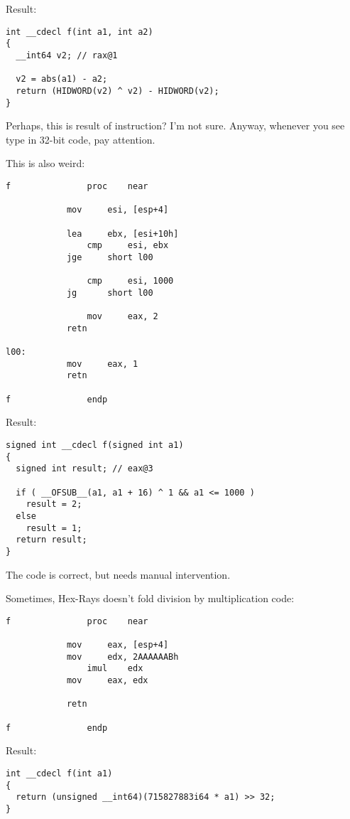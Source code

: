 Result:

\begin{lstlisting}
int __cdecl f(int a1, int a2)
{
  __int64 v2; // rax@1

  v2 = abs(a1) - a2;
  return (HIDWORD(v2) ^ v2) - HIDWORD(v2);
}
\end{lstlisting}

Perhaps, this is result of  instruction? I'm not sure.
Anyway, whenever you see  type in 32-bit code, pay attention.

This is also weird:

\begin{lstlisting}
f               proc    near

	        mov     esi, [esp+4]

        	lea     ebx, [esi+10h]
                cmp     esi, ebx
	        jge     short l00

                cmp     esi, 1000
	        jg      short l00

                mov     eax, 2
	        retn

l00:
	        mov     eax, 1
        	retn

f               endp
\end{lstlisting}

Result:

\begin{lstlisting}
signed int __cdecl f(signed int a1)
{
  signed int result; // eax@3

  if ( __OFSUB__(a1, a1 + 16) ^ 1 && a1 <= 1000 )
    result = 2;
  else
    result = 1;
  return result;
}
\end{lstlisting}

The code is correct, but needs manual intervention.

Sometimes, Hex-Rays doesn't fold division by multiplication code:

\begin{lstlisting}
f               proc    near

        	mov     eax, [esp+4]
	        mov     edx, 2AAAAAABh
                imul    edx
        	mov     eax, edx

	        retn

f               endp
\end{lstlisting}

Result:

\begin{lstlisting}
int __cdecl f(int a1)
{
  return (unsigned __int64)(715827883i64 * a1) >> 32;
}
\end{lstlisting}

